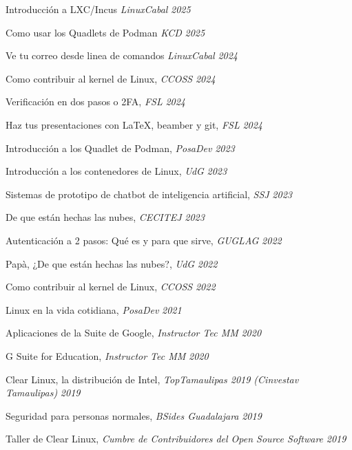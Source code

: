 
\begin{loneinnerlist}

  \item Introducción a LXC/Incus \emph{LinuxCabal} \hfill{\emph{2025}}
  \item Como usar los Quadlets de Podman \emph{KCD} \hfill{\emph{2025}}
  \item Ve tu correo desde linea de comandos \emph{LinuxCabal} \hfill{\emph{2024}}
  \item Como contribuir al kernel de Linux, \emph{CCOSS} \hfill{\emph{2024}}
  \item Verificación en dos pasos o 2FA, \emph{FSL} \hfill{\emph{2024}}
  \item Haz tus presentaciones con \LaTeX{}, beamber y git, \emph{FSL} \hfill{\emph{2024}}
  \item Introducción a los Quadlet de Podman,
	  \emph{PosaDev} \hfill{\emph{2023}}
  \item Introducción a los contenedores de Linux, \emph{UdG} \hfill{\emph{2023}}
  \item Sistemas de prototipo de chatbot de inteligencia artificial,
	  \emph{SSJ} \hfill{\emph{2023}}
  \item De que están hechas las nubes, \emph{CECITEJ} \hfill{\emph{2023}}
  \item Autenticación a 2 pasos: Qué es y para que sirve, \emph{GUGLAG}
    \hfill{\emph{2022}}
  \item Papà, ¿De que están hechas las nubes?, \emph{UdG} \hfill{\emph{2022}}
  \item Como contribuir al kernel de Linux, \emph{CCOSS} \hfill{\emph{2022}}
  \item Linux en la vida cotidiana, \emph{PosaDev} \hfill{\emph{2021}}
  \item Aplicaciones de la Suite de Google, \emph{Instructor Tec MM} \hfill{\emph{2020}}
  \item G Suite for Education, \emph{Instructor Tec MM} \hfill{\emph{2020}}
  \item Clear Linux, la distribución de Intel, \emph{TopTamaulipas 2019 (Cinvestav Tamaulipas)} \hfill{\emph{2019}}
  \item Seguridad para personas normales, \emph{BSides Guadalajara} \hfill{\emph{2019}}
  \item Taller de Clear Linux, \emph{Cumbre de Contribuidores del Open Source Software} \hfill{\emph{2019}}

\end{loneinnerlist}
